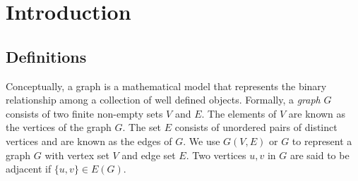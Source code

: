 \chapter{Introduction}
\label{ch:intro}
\section{Definitions}
Conceptually, a graph is a mathematical model that represents the binary relationship among a collection of well defined 
objects. Formally, a {\it graph} $G$ consists of two finite non-empty sets $V$ and $E$. The elements of $V$ are 
known as the vertices of the graph $G$. The set $E$ consists of unordered pairs of distinct vertices and are  
known as the edges of $G$. We use $G(V,E)$ or $G$ to represent a graph $G$ with vertex set $V$ and edge set $E$.  Two 
vertices $u,v$ in $G$ are said to be adjacent if $\{u,v\}\in E(G)$.


